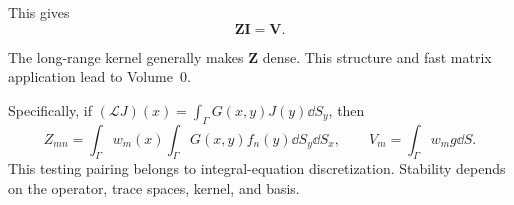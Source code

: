 This gives
\[
\bm Z\bm I=\bm V.
\]

The long-range kernel generally makes $\bm Z$ dense. This structure and fast matrix application lead to Volume~0.

Specifically, if $(\mathcal LJ)(x)=\int_\Gamma G(x,y)J(y)\dd S_y$,
then
\[
Z_{mn}=\int_\Gamma w_m(x)\int_\Gamma G(x,y)f_n(y)\dd S_y\dd S_x,\qquad
V_m=\int_\Gamma w_mg\dd S.
\]
This testing pairing belongs to integral-equation discretization. Stability depends on the operator, trace spaces, kernel, and basis.

